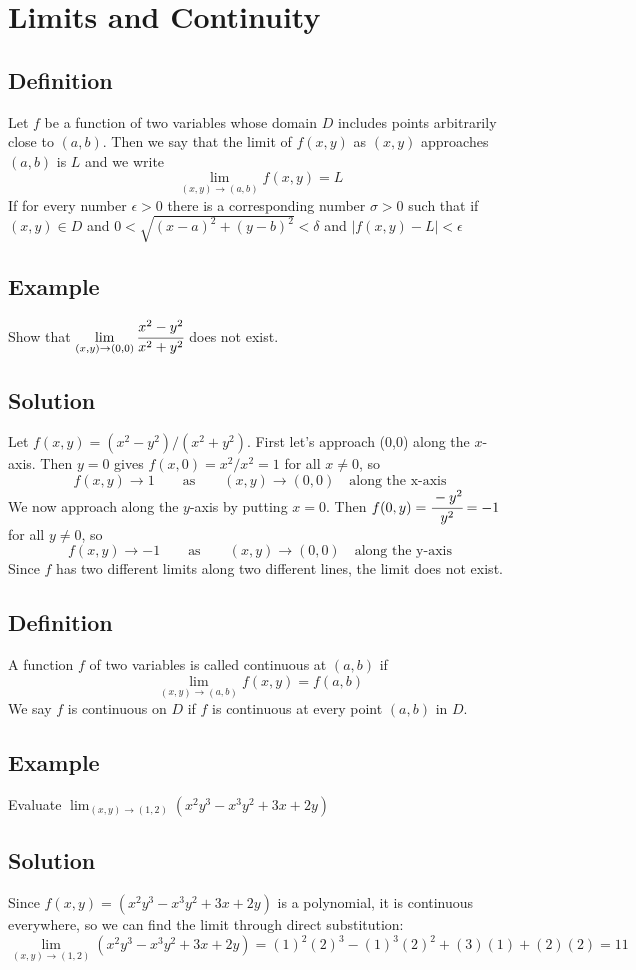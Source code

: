 \section{Limits and Continuity}

\subsection*{Definition}
Let $f$ be a function of two variables whose domain $D$ includes points arbitrarily
close to $(a, b)$. Then we say that the limit of $f(x, y)$ as $(x, y)$ approaches
$(a, b)$ is $L$ and we write
$$\lim_{(x,y)\to(a,b)}f(x,y)=L$$
If for every number $\epsilon>0$ there is a corresponding number $\sigma>0$ such that
if $(x,y)\in D$ and $0<\sqrt{(x-a)^2+(y-b)^2}<\delta$ and $|f(x, y) - L| < \epsilon$

\subsection*{Example}
Show that $\displaystyle\lim_{(x,y)\to(0,0)}\cfrac{x^2-y^2}{x^2+y^2}$ does not exist.

\subsection*{Solution}
Let $f(x,y)=(x^2-y^2)/(x^2+y^2)$. First let's approach (0,0) along the $x$-axis.
Then $y=0$ gives $f(x,0)=x^2/x^2=1$ for all $x\neq 0$, so
$$f(x,y)\to 1 \qquad \text{as} \qquad (x,y)\to(0,0)\quad\text{along the x-axis}$$
We now approach along the $y$-axis by putting $x=0$. Then $f(0,y)=\cfrac{-y^2}{y^2}=-1$
for all $y\neq 0$, so
$$f(x,y)\to -1 \qquad \text{as} \qquad (x,y)\to(0,0)\quad\text{along the y-axis}$$
Since $f$ has two different limits along two different lines, the limit does not exist.

\subsection*{Definition}
A function $f$ of two variables is called continuous at $(a,b)$ if
$$\lim_{(x,y)\to(a,b)} f(x,y)=f(a,b)$$
We say $f$ is continuous on $D$ if $f$ is continuous at every point $(a, b)$ in $D$.

\subsection*{Example}
Evaluate $\displaystyle\lim_{(x,y)\to(1,2)}(x^2y^3-x^3y^2+3x+2y)$

\subsection*{Solution}
Since $f(x,y)=(x^2y^3-x^3y^2+3x+2y)$ is a polynomial, it is continuous everywhere,
so we can find the limit through direct substitution:
$$\lim_{(x,y)\to(1,2)}(x^2y^3-x^3y^2+3x+2y)=(1)^2(2)^3-(1)^3(2)^2+(3)(1)+(2)(2)=11$$

